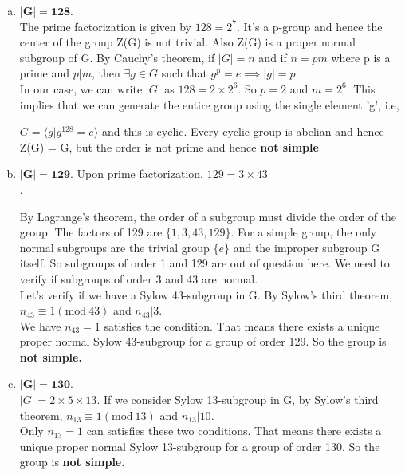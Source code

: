 \documentclass[11pt,a4paper]{article}
\begin{document}
\begin{enumerate}[1.]
\begin{enumerate}[2.]
\begin{flushleft}
\begin{enumerate}[(a)]
			
			
			\item $\mathbf{|G| = 128}$. \\
			The prime factorization is given by $128 = 2^7$. It's a p-group and hence the center of the group Z(G) is not trivial. Also Z(G) is a proper normal subgroup of G. By Cauchy's theorem, if $|G| = n$ and if $n = pm$ where p is a prime and $p|m$, then $\exists g \in G$ such that $g^p = e \implies |g| = p$\medskip\\
			
			In  our case, we can write $|G|$ as $128 = 2\times2^6$. So $p = 2$ and $m = 2^6$. This implies that we can generate the entire group using the single element 'g', i.e, 
			
			$G = \langle g | g^{128}=e\rangle$ and this is cyclic. Every cyclic group is abelian and hence Z(G) = G, but the order is not prime and hence \textbf{not simple}
			
			\item $\mathbf{|G| = 129}$. Upon prime factorization, $129 = 3\times43$\\. 
			
			By Lagrange's theorem, the order of a subgroup must divide the order of the group. The factors of 129 are $\{1, 3, 43, 129\}$. For a simple group, the only normal subgroups are the trivial group $\{e\}$ and the improper subgroup G itself. So subgroups of order 1 and 129 are out of question here. We need to verify if subgroups of order 3 and 43 are normal.\medskip\\
			
			Let's verify if we have a Sylow 43-subgroup in G. By Sylow's third theorem, $n_{43} \equiv 1(\textrm{mod}\ 43)$ and $n_{43}|3$.\\
			We have $n_{43} = 1$ satisfies the condition. That means there exists a unique proper normal Sylow 43-subgroup for a group of order 129. So the group is \textbf{not simple.}
			
			\item $\mathbf{|G| = 130}$.\medskip\\
			
			$|G| = 2\times5\times13$. If we consider Sylow 13-subgroup in G, by Sylow's third theorem, $n_{13} \equiv 1(\textrm{mod}\ 13)$ and $n_{13}|10$.\\
			Only $n_{13} = 1$ can satisfies these two conditions. That means there exists a unique proper normal Sylow 13-subgroup for a group of order 130. So the group is \textbf{not simple.}
			

\end{enumerate}
\end{flushleft}
\end{enumerate}
\end{enumerate}
\end{document}
